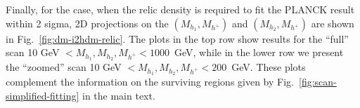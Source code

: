 \documentclass[12pt,a4paper]{article}
\begin{document}

Finally, for the case, when the relic density is required to fit the PLANCK result within 2 sigma,
 2D projections on the $(M_{h_1}, M_{h^+})$ and $(M_{h_2}, M_{h^+})$ are shown in Fig.~\ref{fig:dm-i2hdm-relic}. The plots in the top row show results for the ``full'' scan 
10 GeV $< M_{h_1}, M_{h_2}, M_{h^{+}} < 1000$~GeV, while in the lower row we present the ``zoomed'' scan 10 GeV $< M_{h_1}, M_{h_2}, M_{h^{+}} < 200$~GeV.
These plots complement the information on the surviving regions given by Fig.~\ref{fig:scan-simplified-fitting}
in the main text.





%
%

\end{document}
